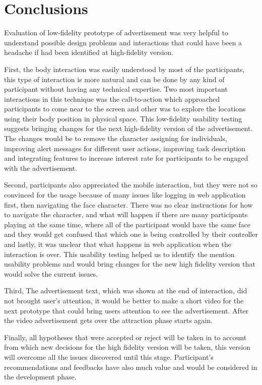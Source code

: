 \section{Conclusions}

Evaluation of low-fidelity prototype of advertisement was very helpful to understand possible design problems and interactions that could have been a headache if had been identified at high-fidelity version. 

First, the body interaction was easily understood by most of the participants, this type of interaction is more natural and can be done by any kind of participant without having any technical expertise. Two most important interactions in this technique was the call-to-action which approached participants to come near to the screen and other was to explore the locations using their body position in physical space. This low-fidelity usability testing suggests bringing changes for the next high-fidelity version of the advertisement. The changes would be to remove the character assigning for individuals, improving alert messages for different user actions, improving task description and integrating features to increase interest rate for participants to be engaged with the advertisement.

Second, participants also appreciated the mobile interaction, but they were not so convinced for the usage because of many issues like logging in web application first, then navigating the face character. There was no clear instructions for how to navigate the character, and what will happen if there are many participants playing at the same time, where all of the participant would have the same face and they would get confused that which one is being controlled by their controller and lastly, it was unclear that what happens in web application when the interaction is over. This usability testing helped us to identify the mention usability problems and would bring changes for the new high fidelity version that would solve the current issues.

Third, The advertisement text, which was shown at the end of interaction, did not brought user’s attention, it would be better to make a short video for the next prototype that could bring users attention to see the advertisement. After the video advertisement gets over the attraction phase starts again.

Finally, all hypotheses that were accepted or reject will be taken in to account from which new decisions for the high fidelity version will be taken, this version will overcome all the issues discovered until this stage. Participant’s recommendations and feedbacks have also much value and would be considered in the development phase.
